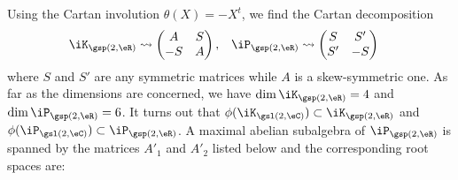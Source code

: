 Using the Cartan involution $\theta(X)=-X^t$, we find the Cartan decomposition
\begin{align}
	\iK_{\gsp(2,\eR)} & \leadsto
	\begin{pmatrix}
		A & S \\-S&A
	\end{pmatrix},
	                  & \iP_{\gsp(2,\eR)} & \leadsto
	\begin{pmatrix}
		S & S' \\S'&-S
	\end{pmatrix}
\end{align}
where $S$ and $S'$ are any symmetric matrices while $A$ is a skew-symmetric one. As far as the dimensions are concerned, we have $\dim\iK_{\gsp(2,\eR)}=4$ and $\dim\iP_{\gsp(2,\eR)}=6$. It turns out that $\phi(\iK_{\gsl(2,\eC)})\subset\iK_{\gsp(2,\eR)}$ and $\phi(\iP_{\gsl(2,\eC)})\subset \iP_{\gsp(2,\eR)}$. A maximal abelian subalgebra of $\iP_{\gsp(2,\eR)}$ is spanned by the matrices $A'_1$ and $A'_2$ listed below and the corresponding root spaces are:
